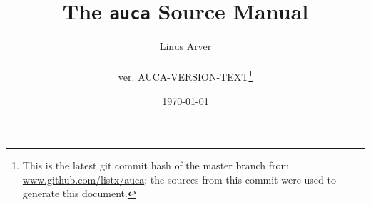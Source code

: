 \documentclass[letterpaper,twoside,12pt]{article}
\newcommand*\fn[1]{\footnote{#1}}
\begin{document}
\title{The \texttt{auca} Source Manual}
\author{Linus Arver\\
\\
{\small ver. AUCA-VERSION-TEXT\fn{This is the latest git commit hash of the master branch from \url{www.github.com/listx/auca}; the sources from this commit were used to generate this document.}}
}
\date{\today}
\maketitle
\tableofcontents






\end{document}
